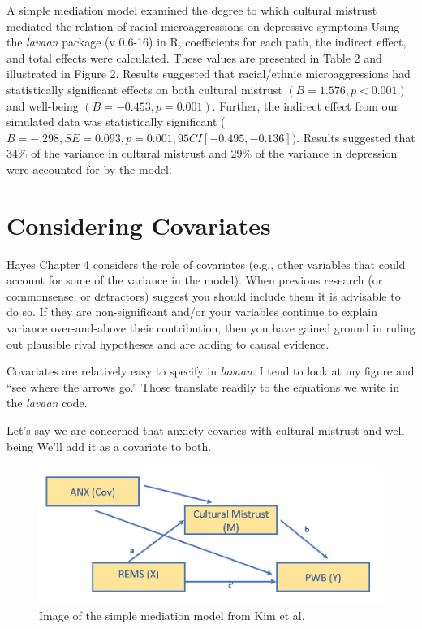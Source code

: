 \documentclass[
  11pt,
]{book}
\begin{document}
A simple mediation model examined the degree to which cultural mistrust mediated the relation of racial microaggressions on depressive symptoms Using the \emph{lavaan} package (v 0.6-16) in R, coefficients for each path, the indirect effect, and total effects were calculated. These values are presented in Table 2 and illustrated in Figure 2. Results suggested that racial/ethnic microaggressions had statistically significant effects on both cultural mistrust \((B = 1.576, p < 0.001)\) and well-being \((B = -0.453, p = 0.001)\). Further, the indirect effect from our simulated data was statistically significant (\(B = -.298, SE = 0.093, p = 0.001, 95CI[-0.495,-0.136])\). Results suggested that 34\% of the variance in cultural mistrust and 29\% of the variance in depression were accounted for by the model.

\hypertarget{considering-covariates}{%
\section{Considering Covariates}\label{considering-covariates}}

Hayes Chapter 4 \citeyearpar{hayes_introduction_2018} considers the role of covariates (e.g., other variables that could account for some of the variance in the model). When previous research (or commonsense, or detractors) suggest you should include them it is advisable to do so. If they are non-significant and/or your variables continue to explain variance over-and-above their contribution, then you have gained ground in ruling out plausible rival hypotheses and are adding to causal evidence.

Covariates are relatively easy to specify in \emph{lavaan}. I tend to look at my figure and ``see where the arrows go.'' Those translate readily to the equations we write in the \emph{lavaan} code.

Let's say we are concerned that anxiety covaries with cultural mistrust and well-being We'll add it as a covariate to both.

\begin{figure}
\centering
\includegraphics{images/SimpleMed/Kim_wCovs.jpg}
\caption{Image of the simple mediation model from Kim et al.}
\end{figure}
\end{document}
